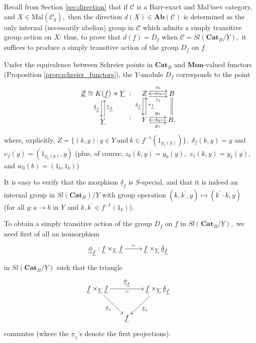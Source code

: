 \documentclass[11pt]{amsart}
\theoremstyle{plain}
\theoremstyle{definition}
\theoremstyle{remark}
\newcommand{\un}{\underline}
\begin{document}
Recall from Section \ref{sec:direction} that if $\mathcal{C}$ is a Barr-exact and Mal'tsev category, and $X\in\mathrm{Mal}(\mathcal{C}_g),$ then the direction $d(X)\in\mathbf{Ab}(\mathcal{C})$ is determined as the only internal (necessarily abelian) group in $\mathcal{C}$ which admits a simply transitive group action on $X$: thus, to prove that $d(\un{f})=D_{\un{f}}$ when $\mathcal{C}=Sl(\mathbf{Cat}_B/\un{Y}),$ it suffices to produce a simply transitive action of the group $D_{\un{f}}$ on $\un{f}.$

Under the equivalence between Schreier points in $\mathbf{Cat}_B$ and $\mathbf{Mon}$-valued functors (Proposition \ref{prop:schreier_functors}), the $\un{Y}$-module $D_{\un{f}}$ corresponds to the point
\begin{equation*}
\begin{aligned}
{
\xymatrix{
{\underline{Z}\cong K(\un{f})\rtimes\un{Y}} \ar@<-.5ex>[d]_-{\underline{\delta}_{\un{f}}}\\
{\underline{Y}} \ar@<-.5ex>[u]_-{\underline{\upsilon}_{\un{f}}}
}
}
{\xymatrix{: \\ :}}
{
\xymatrix{
{Z} \ar@<-.5ex>[d]_-{\delta_{\un{f}}} \ar@<.9ex>[r]^-{z_0} \ar@<-.9ex>[r]_-{z_1} &{B} \ar@{=}[d] \ar[l]|{w_0} \\
{Y} \ar@<-.5ex>[u]_-{\upsilon_{\un{f}}} \ar@<.9ex>[r]^-{y_0} \ar@<-.9ex>[r]_-{y_1} &{B,} \ar[l]|{t_0}
}
}
\end{aligned}
\end{equation*}
where, explicitly, $Z=\{(k,y):y\in Y \ \text{and} \ k\in f^{-1}(1_{y_1(y)})\},$ $\delta_{\un{f}}(k,y)=y$ and $\upsilon_{\un{f}}(y)=(1_{y_1(y)},y)$ (plus, of course, $z_0(k,y)=y_0(y),$ $z_1(k,y)=y_1(y),$ and $w_0(b)=(1_b,1_b)$).

It is easy to verify that the morphism $\un{\delta}_{\un{f}}$ is $S$-special, and that it is indeed an internal group in $Sl({\mathbf{Cat}_B})/\un{Y}$ with group operation $(k,k^\prime,y)\mapsto (k^\prime\cdot k,y)$ (for all $y\colon a\rightarrow b$ in $Y$ and $k,k^\prime\in f^{-1}(1_b)$).

To obtain a simply transitive action of the group $D_{\un{f}}$ on $\un{f}$ in $Sl(\mathbf{Cat}_B/\un{Y}),$ we need first of all an isomorphism
\begin{equation}
\label{eqn:phi_f}
\xymatrix{ {\un{\phi}_{\un{f}}: \un{f}\times_{\un{Y}} \un{f} } \ar[r]^-{\sim} &{ \un{f}\times_{\un{Y}} \un{\delta}_{\un{f}} } }
\end{equation}
in $Sl(\mathbf{Cat}_B/\un{Y})$ such that the triangle
\begin{equation}
\begin{aligned}
\label{eqn:phi_f_slice}
\xymatrixcolsep{1.5pc}
\xymatrix{
{ \un{f}\times_{\un{Y}} \un{f} } \ar[rr]^-{\un{\phi}_{\un{f}}}_-{\sim} \ar[rd]_-{\un{\pi}_1} &\ &{ \un{f}\times_{\un{Y}} \un{\delta}_{\un{f}} } \ar[ld]^-{\un{\pi}_1} \\
&{\un{f}} &\
}
\end{aligned}
\end{equation}
commutes (where the $\un{\pi}_1$'s denote the first projections).
\end{document}
